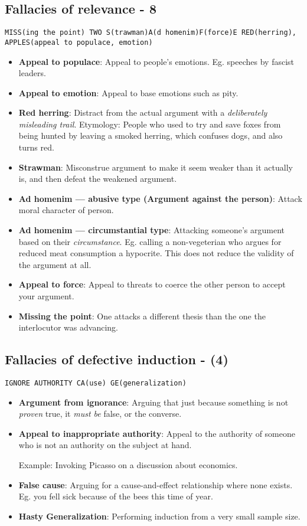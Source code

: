 \documentclass[5pt]{book}
\begin{document}
\subsection{Fallacies of relevance - 8} 
\texttt{MISS(ing the point) TWO S(trawman)A(d homenim)F(force)E RED(herring), APPLES(appeal to populace, emotion)}
\begin{itemize}
    \item \textbf{Appeal to populace}: Appeal to people's emotions. Eg. speeches
        by fascist leaders.
    \item \textbf{Appeal to emotion}: Appeal to base emotions such as pity.
    \item \textbf{Red herring}: Distract from the actual argument with a
        \textit{deliberately misleading trail}. Etymology: People who used to
        try and save foxes from being hunted by leaving a smoked herring, which
        confuses dogs, and also turns red.
    \item \textbf{Strawman}: Misconstrue argument to make it seem weaker
        than it actually is, and then defeat the weakened argument.
    \item \textbf{Ad homenim --- abusive type (Argument against the person)}: Attack moral character
        of person. 
    \item \textbf{Ad homenim --- circumstantial type}: Attacking someone's argument
        based on their \textit{circumstance}. Eg. calling a non-vegeterian who
        argues for reduced meat consumption a hypocrite. This does not reduce the
        validity of the argument at all.
    \item \textbf{Appeal to force}: Appeal to threats to coerce the other
        person to accept your argument.
    \item \textbf{Missing the point}: One attacks a different thesis than
        the one the interlocutor was advancing.

\end{itemize}
\subsection{Fallacies of defective induction - (4)}
\texttt{IGNORE AUTHORITY CA(use) GE(generalization)}
\begin{itemize}
    \item \textbf{Argument from ignorance}: Arguing that just because something
        is not \emph{proven} true, it \textit{must be} false, or the converse.
    \item \textbf{Appeal to inappropriate authority}: Appeal to the authority
        of someone who is not an authority on the subject at hand. 

        Example: Invoking Picasso on a discussion about economics.

    \item \textbf{False cause}: Arguing for a cause-and-effect relationship
        where none exists. Eg. you fell sick because of the bees this time
        of year.

    \item \textbf{Hasty Generalization}: Performing induction from a very
        small sample size.
\end{itemize}
\end{document}
